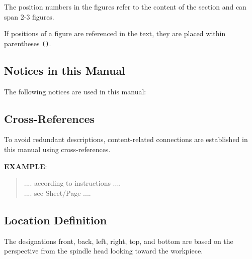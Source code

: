 The position numbers in the figures refer to the content of the section and can span 2-3 figures.

If positions of a figure are referenced in the text, they are placed within parentheses \texttt{()}.

\subsection{Notices in this Manual}

The following notices are used in this manual:




\subsection{Cross-References}

To avoid redundant descriptions, content-related connections are established in this manual using cross-references.

\textbf{EXAMPLE}:
\begin{quote}
\noindent \hspace{-0.25cm} .... according to instructions .... \\
\hspace{1.3cm} .... see Sheet/Page ....
\end{quote}

\subsection{Location Definition}

The designations front, back, left, right, top, and bottom are based on the perspective from the spindle head looking toward the workpiece.
